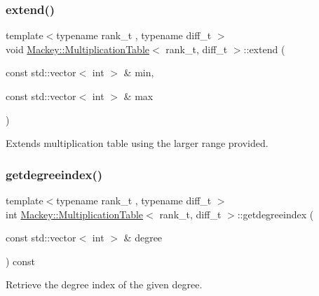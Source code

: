 \subsubsection{\texorpdfstring{extend()}{extend()}}
{\footnotesize\ttfamily template$<$typename rank\+\_\+t , typename diff\+\_\+t $>$ \\
void \hyperlink{classMackey_1_1MultiplicationTable}{Mackey\+::\+Multiplication\+Table}$<$ rank\+\_\+t, diff\+\_\+t $>$\+::extend (\begin{DoxyParamCaption}\item[{const std\+::vector$<$ int $>$ \&}]{min,  }\item[{const std\+::vector$<$ int $>$ \&}]{max }\end{DoxyParamCaption})}



Extends multiplication table using the larger range provided. 

\mbox{\label{classMackey_1_1MultiplicationTable_ac15f13c4a9d160226582e1970ef4b00c}} 
\subsubsection{\texorpdfstring{getdegreeindex()}{getdegreeindex()}}
{\footnotesize\ttfamily template$<$typename rank\+\_\+t , typename diff\+\_\+t $>$ \\
int \hyperlink{classMackey_1_1MultiplicationTable}{Mackey\+::\+Multiplication\+Table}$<$ rank\+\_\+t, diff\+\_\+t $>$\+::getdegreeindex (\begin{DoxyParamCaption}\item[{const std\+::vector$<$ int $>$ \&}]{degree }\end{DoxyParamCaption}) const\hspace{0.3cm}{\ttfamily [inline]}}



Retrieve the degree index of the given degree. 

